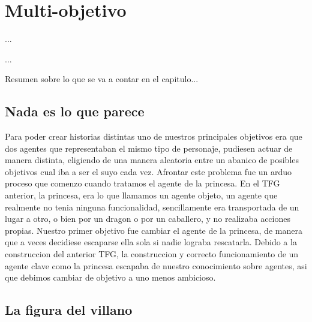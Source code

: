 
%
%

\chapter{Multi-objetivo}

\begin{FraseCelebre}
\begin{Frase}
...
\end{Frase}
\begin{Fuente}
...
\end{Fuente}
\end{FraseCelebre}

\begin{resumen}
Resumen sobre lo que se va a contar en el capitulo...
\end{resumen}


\section{Nada es lo que parece}
\label{cap22:sec:objetivos}

Para poder crear historias distintas uno de nuestros principales objetivos era que dos agentes que representaban el mismo tipo de personaje, pudiesen actuar de manera distinta, eligiendo de una manera aleatoria entre un abanico de posibles objetivos cual iba a ser el suyo cada vez.
Afrontar este problema fue un arduo proceso que comenzo cuando tratamos el agente de la princesa. En el TFG anterior, la princesa, era lo que llamamos un agente objeto, un agente que realmente no tenia ninguna funcionalidad, sencillamente era transportada de un lugar a otro, o bien por un dragon o por un caballero, y no realizaba acciones propias.
Nuestro primer objetivo fue cambiar el agente de la princesa, de manera que a veces decidiese escaparse ella sola si nadie lograba rescatarla. Debido a la construccion del anterior TFG, la construccion y correcto funcionamiento de un agente clave como la princesa escapaba de nuestro conocimiento sobre agentes, asi que debimos cambiar de objetivo a uno menos ambicioso.


\section{La figura del villano}

